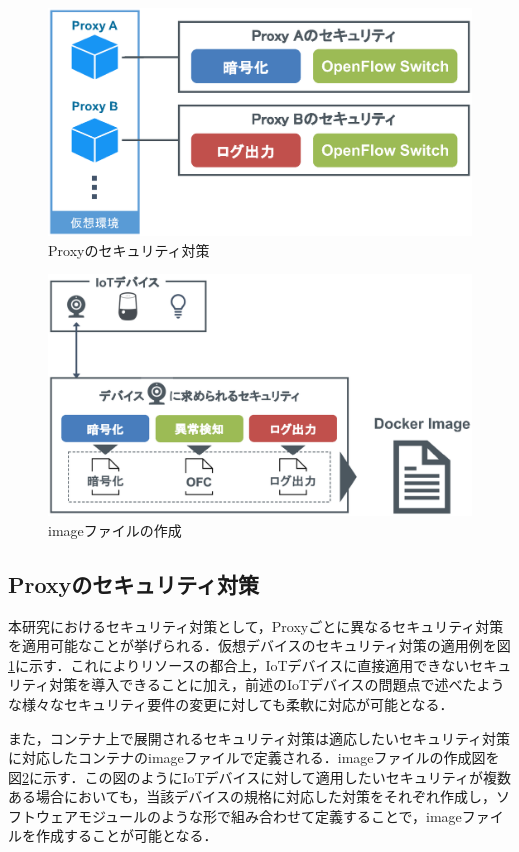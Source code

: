 \documentclass[Japanese]{dicomopapers}
\begin{document}
\begin{figure}[!tb]
	\centering
	\includegraphics[width=\linewidth]{img/security.eps}
	\caption{Proxyのセキュリティ対策}
	\label{fig:security}
\end{figure}

\begin{figure}[!tb]
	\centering
	\includegraphics[width=\linewidth]{img/dockerimage.eps}
	\caption{imageファイルの作成}
	\label{fig:dockerimage}
\end{figure}

\subsection{Proxyのセキュリティ対策}
本研究におけるセキュリティ対策として，Proxyごとに異なるセキュリティ対策を適用可能なことが挙げられる．仮想デバイスのセキュリティ対策の適用例を図\ref{fig:security}に示す．これによりリソースの都合上，IoTデバイスに直接適用できないセキュリティ対策を導入できることに加え，前述のIoTデバイスの問題点で述べたような様々なセキュリティ要件の変更に対しても柔軟に対応が可能となる．\par
また，コンテナ上で展開されるセキュリティ対策は適応したいセキュリティ対策に対応したコンテナのimageファイルで定義される．imageファイルの作成図を図\ref{fig:dockerimage}に示す．この図のようにIoTデバイスに対して適用したいセキュリティが複数ある場合においても，当該デバイスの規格に対応した対策をそれぞれ作成し，ソフトウェアモジュールのような形で組み合わせて定義することで，imageファイルを作成することが可能となる．
\end{document}
